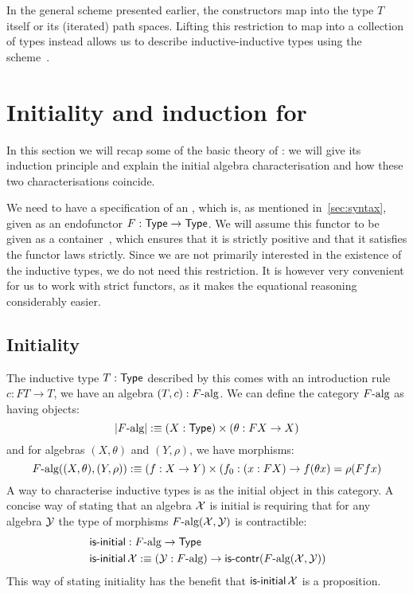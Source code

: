 \documentclass[a4paper,10pt]{article}
\begin{document}
In the general scheme presented earlier, the constructors map into the
type $T$ itself or its (iterated) path spaces. Lifting this
restriction to map into a collection of types instead allows us to
describe inductive-inductive types using the
scheme~\cite{Capriotti2014}.

\section{Initiality and induction for \oits}
\label{sec:oits}

In this section we will recap some of the basic theory of \oits: we
will give its induction principle and explain the initial algebra
characterisation and how these two characterisations coincide.

We need to have a specification of an \oit, which is, as mentioned
in~\cref{sec:syntax}, given as an endofunctor $F : \mathsf{Type} \to \mathsf{Type}$.
We will assume this functor to be given as a
container~\cite{Abbott2005}, which ensures that it is strictly
positive and that it satisfies the functor laws strictly. Since we are
not primarily interested in the existence of the inductive types, we
do not need this restriction. It is however very convenient for us to
work with strict functors, as it makes the equational reasoning
considerably easier.

\subsection{Initiality}
\label{sec:oitinitiality}

The inductive type $T : \mathsf{Type}$ described by this comes with an
introduction rule $c : FT \to T$, \ie we have an algebra
$(T,c) : F\mbox{-alg}$. We can define the category $F\mbox{-alg}$ as
having objects:
$$
| F\mbox{-alg} | :\equiv (X : \mathsf{Type}) \times (\theta : FX \to X)
$$
and for algebras $(X,\theta)$ and $(Y,\rho)$, we have morphisms:
$$
F\mbox{-alg}((X,\theta),(Y,\rho)) :\equiv (f : X \to Y) \times (f_0 : (x : FX) \to f (\theta x) = \rho (F f x)
$$
A way to characterise inductive types is as the initial object in this
category. A concise way of stating that an algebra $\mathcal{X}$ is
initial is requiring that for any algebra $\mathcal{Y}$ the type of
morphisms $F\mbox{-alg}(\mathcal{X},\mathcal{Y})$ is contractible:
%
\begin{align*}
&\operatorname{\mathsf{is-initial}} : F\mbox{-alg} \to \mathsf{Type} \\
&\operatorname{\mathsf{is-initial}} \mathcal{X} :\equiv (\mathcal{Y} : F\mbox{-alg}) \to \operatorname{\mathsf{is-contr}} (F\mbox{-alg}(\mathcal{X},\mathcal{Y}))
\end{align*}
%
This way of stating initiality has the benefit that
$\operatorname{\mathsf{is-initial}} \mathcal{X}$ is a proposition.
\end{document}
